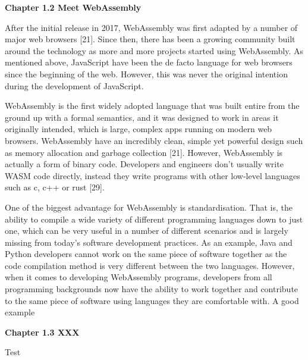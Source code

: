 \bigskip

\textbf{{\Large Chapter 1.2 Meet WebAssembly}}

\bigskip

After the initial release in 2017, WebAssembly was first adapted by a number of major web browsers [21]. Since then, there has been a growing community built around the technology as more and more projects started using WebAssembly. As mentioned above, JavaScript have been the de facto language for web browsers since the beginning of the web. However, this was never the original intention during the development of JavaScript.

WebAssembly is the first widely adopted language that was built entire from the ground up with a formal semantics, and it was designed to work in areas it originally intended, which is large, complex apps running on modern web browsers. WebAssembly have an incredibly clean, simple yet powerful design such as memory allocation and garbage collection [21]. However, WebAssembly is actually a form of binary code. Developers and engineers don't usually write WASM code directly, instead they write programs with other low-level languages such as c, c++ or rust [29].

One of the biggest advantage for WebAssembly is standardisation. That is, the ability to compile a wide variety of different programming languages down to just one, which can be very useful in a number of different scenarios and is largely missing from today's software development practices. As an example, Java and Python developers cannot work on the same piece of software together as the code compilation method is very different between the two languages. However, when it comes to developing WebAssembly programs, developers from all programming backgrounds now have the ability to work together and contribute to the same piece of software using languages they are comfortable with. A good example 

\bigskip
\bigskip

\textbf{{\Large Chapter 1.3 XXX}}

\bigskip

Test